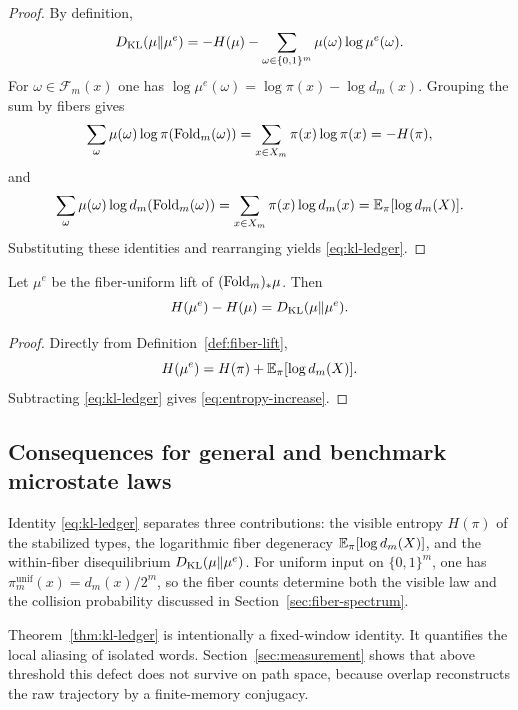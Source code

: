 \begin{proof}
By definition,
\[
D_{\mathrm{KL}}(\mu\|\mu^e)
=
-H(\mu)-\sum_{\omega\in\{0,1\}^m}\mu(\omega)\log \mu^e(\omega).
\]
For $\omega\in\mathcal{F}_m(x)$ one has $\log\mu^e(\omega)=\log\pi(x)-\log d_m(x)$. Grouping the sum by fibers gives
\[
\sum_{\omega}\mu(\omega)\log\pi(\mathrm{Fold}_m(\omega))
=
\sum_{x\in X_m}\pi(x)\log\pi(x)
=
-H(\pi),
\]
and
\[
\sum_{\omega}\mu(\omega)\log d_m(\mathrm{Fold}_m(\omega))
=
\sum_{x\in X_m}\pi(x)\log d_m(x)
=
\mathbb{E}_\pi[\log d_m(X)].
\]
Substituting these identities and rearranging yields \eqref{eq:kl-ledger}.
\end{proof}

\begin{corollary}\label{cor:entropy-increase}
Let $\mu^e$ be the fiber-uniform lift of $(\mathrm{Fold}_m)_*\mu$. Then
\begin{equation}\label{eq:entropy-increase}
H(\mu^e)-H(\mu)=D_{\mathrm{KL}}(\mu\|\mu^e).
\end{equation}
\end{corollary}

\begin{proof}
Directly from Definition~\ref{def:fiber-lift},
\[
H(\mu^e)=H(\pi)+\mathbb{E}_\pi[\log d_m(X)].
\]
Subtracting \eqref{eq:kl-ledger} gives \eqref{eq:entropy-increase}.
\end{proof}

\subsection{Consequences for general and benchmark microstate laws}\label{sec:entropy-ledger:consequences}

\begin{remark}
Identity \eqref{eq:kl-ledger} separates three contributions: the visible entropy $H(\pi)$ of the stabilized types, the logarithmic fiber degeneracy $\mathbb{E}_\pi[\log d_m(X)]$, and the within-fiber disequilibrium $D_{\mathrm{KL}}(\mu\|\mu^e)$. For uniform input on $\{0,1\}^m$, one has $\pi_m^{\mathrm{unif}}(x)=d_m(x)/2^m$, so the fiber counts determine both the visible law and the collision probability discussed in Section~\ref{sec:fiber-spectrum}.
\end{remark}

\begin{remark}
Theorem~\ref{thm:kl-ledger} is intentionally a fixed-window identity. It quantifies the local aliasing of isolated words. Section~\ref{sec:measurement} shows that above threshold this defect does not survive on path space, because overlap reconstructs the raw trajectory by a finite-memory conjugacy.
\end{remark}

